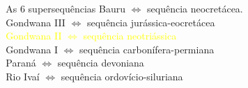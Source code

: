 \documentclass[10pt]{beamer} %
\begin{document}
\begin{frame}
\begin{columns}
\begin{column}{0.4\textwidth}
\begin{figure}
			\end{figure}
		\end{column}
		\begin{column}{0.75\textwidth}
			\begin{block}{As $6$ supersequências}
				Bauru $\Longleftrightarrow$  sequência neocretácea.\\
				Gondwana III $\Longleftrightarrow$ sequência jurássica-eocretácea\\
				\textcolor{yellow}{Gondwana II $\Longleftrightarrow$ sequência neotriássica} \\
				Gondwana I $\Longleftrightarrow$ sequência carbonífera-permiana\\ 
				Paraná $\Longleftrightarrow$ sequência devoniana\\
				Rio Ivaí $\Longleftrightarrow$ sequência ordovício-siluriana\\
				\cite{Vail_1977,assine_1994,milani_orogenias_1998}
			\end{block}
		\end{column}
	\end{columns}
\end{frame}
\end{document}

